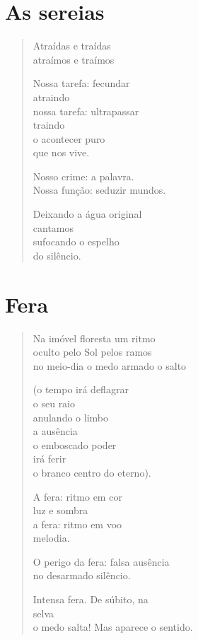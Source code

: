 \chapter{As sereias}

\begin{verse}
Atraídas e traídas\\
atraímos e traímos

Nossa tarefa: fecundar\\
\hfill atraindo\\
nossa tarefa: ultrapassar\\
\hfill traindo\\
o acontecer puro\\
que nos vive.

Nosso crime: a palavra.\\
Nossa função: seduzir mundos.

Deixando a água original\\
cantamos\\
sufocando o espelho\\
do silêncio.
\end{verse}

\chapter{Fera}

\begin{verse}
Na imóvel floresta \hfill um ritmo\\
oculto pelo Sol \hfill pelos ramos\\
no meio-dia \quad o medo armado \hfill o salto

(o tempo irá deflagrar\\
\quad\quad\quad o seu raio\\
anulando o limbo\\
\quad\quad\quad a ausência\\
o emboscado poder\\
\quad\quad\quad irá ferir\\
o branco centro do eterno).

A fera: ritmo em cor\\
\quad\quad luz e sombra\\
a fera: ritmo em voo\\
\quad\quad melodia.

O perigo da fera: falsa ausência\\
no desarmado silêncio.

Intensa fera. De súbito, na\\
\hfill selva\\
o medo salta! Mas aparece o sentido.
\end{verse}

